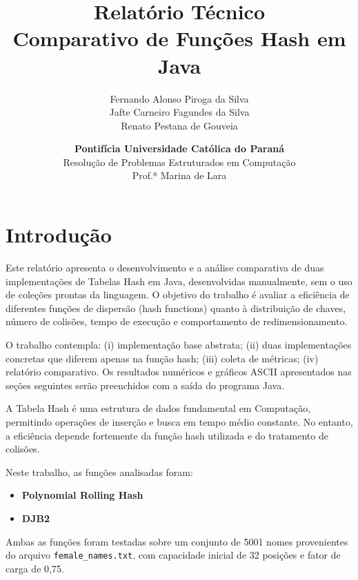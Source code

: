 \documentclass[12pt,a4paper]{abntex2}
\begin{document}
\title{Relatório Técnico \\ Comparativo de Funções Hash em Java}
\author{Fernando Alonso Piroga da Silva \\ Jafte Carneiro Fagundes da Silva \\ Renato Pestana de Gouveia}
\date{\textbf{Pontifícia Universidade Católica do Paraná} \\ Resolução de Problemas Estruturados em Computação \\ Prof.ª Marina de Lara}
\maketitle

\tableofcontents
\newpage

\section{Introdução}
Este relatório apresenta o desenvolvimento e a análise comparativa de duas implementações de Tabelas Hash em Java, desenvolvidas manualmente, sem o uso de coleções prontas da linguagem. O objetivo do trabalho é avaliar a eficiência de diferentes funções de dispersão (hash functions) quanto à distribuição de chaves, número de colisões, tempo de execução e comportamento de redimensionamento.

O trabalho contempla: (i) implementação base abstrata; (ii) duas implementações concretas que diferem apenas na função hash; (iii) coleta de métricas; (iv) relatório comparativo. Os resultados numéricos e gráficos ASCII apresentados nas seções seguintes serão preenchidos com a saída do programa Java.


A Tabela Hash é uma estrutura de dados fundamental em Computação, permitindo operações de inserção e busca em tempo médio constante. No entanto, a eficiência depende fortemente da função hash utilizada e do tratamento de colisões.

Neste trabalho, as funções analisadas foram:

\begin{itemize}
  \item \textbf{Polynomial Rolling Hash}
  \item \textbf{DJB2}
\end{itemize}

Ambas as funções foram testadas sobre um conjunto de 5001 nomes provenientes do arquivo \texttt{female\_names.txt}, com capacidade inicial de 32 posições e fator de carga de 0,75.
\end{document}
